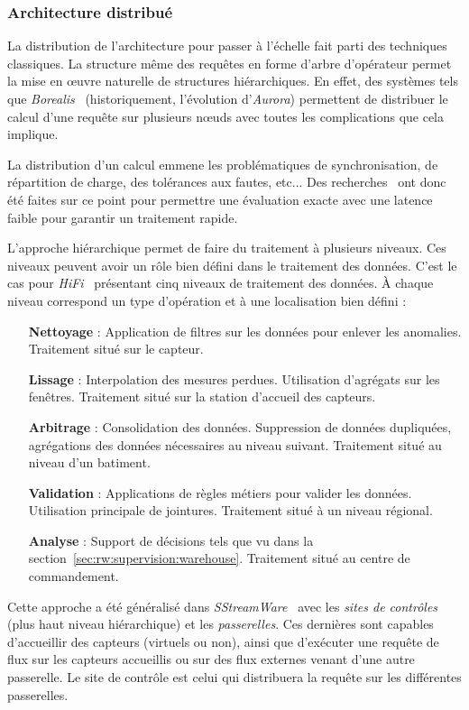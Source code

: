 \subsubsection{Architecture distribué}
La distribution de l'architecture pour passer à l'échelle fait parti des techniques classiques. La structure même des requêtes en forme d'arbre d'opérateur permet la mise en œuvre naturelle de structures hiérarchiques. En effet, des systèmes tels que \textit{Borealis}~\cite{Abadi:borealis} (historiquement, l'évolution d'\textit{Aurora}) permettent de distribuer le calcul d'une requête sur plusieurs nœuds avec toutes les complications que cela implique.

La distribution d'un calcul emmene les problématiques de synchronisation, de répartition de charge, des tolérances aux fautes, etc... Des recherches~\cite{Hwang:distributed, Tucker:heartbeat} ont donc été faites sur ce point pour permettre une évaluation exacte avec une latence faible pour garantir un traitement rapide.

L'approche hiérarchique permet de faire du traitement à plusieurs niveaux. Ces niveaux peuvent avoir un rôle bien défini dans le traitement des données. C'est le cas pour \textit{HiFi}~\cite{Franklin:hifi} présentant cinq niveaux de traitement des données. À chaque niveau correspond un type d'opération et à une localisation bien défini :
\begin{itemize}
	\item[\textbf{Nettoyage} :] Application de filtres sur les données pour enlever les anomalies. Traitement situé sur le capteur.
	\item[\textbf{Lissage} :] Interpolation des mesures perdues. Utilisation d'agrégats sur les fenêtres. Traitement situé sur la station d'accueil des capteurs.
	\item[\textbf{Arbitrage} :] Consolidation des données. Suppression de données dupliquées, agrégations des données nécessaires au niveau suivant. Traitement situé au niveau d'un batiment.
	\item[\textbf{Validation} :] Applications de règles métiers pour valider les données. Utilisation principale de jointures. Traitement situé à un niveau régional.
	\item[\textbf{Analyse} :] Support de décisions tels que vu dans la section~\ref{sec:rw:supervision:warehouse}. Traitement situé au centre de commandement.
\end{itemize}

Cette approche a été généralisé dans \textit{SStreamWare}~\cite{Gurgen:sstreamware} avec les \textit{sites de contrôles} (plus haut niveau hiérarchique) et les \textit{passerelles}. Ces dernières sont capables d'accueillir des capteurs (virtuels ou non), ainsi que d'exécuter une requête de flux sur les capteurs accueillis ou sur des flux externes venant d'une autre passerelle. Le site de contrôle est celui qui distribuera la requête sur les différentes passerelles.

